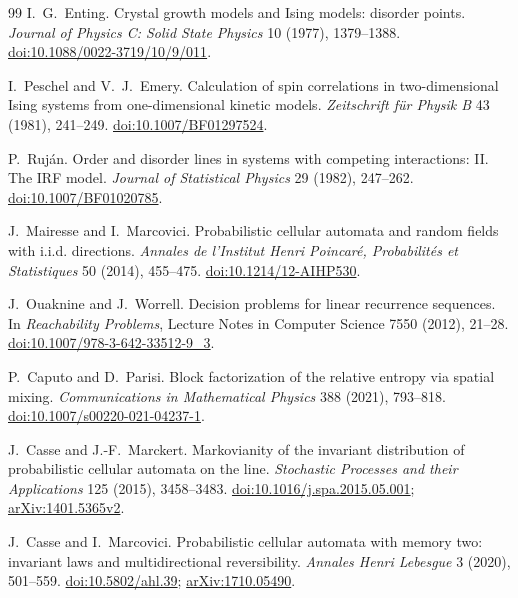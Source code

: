 \begin{thebibliography}{99}
 I.~G.~Enting.
Crystal growth models and Ising models: disorder points.
\emph{Journal of Physics C: Solid State Physics} 10 (1977), 1379--1388.
\href{https://doi.org/10.1088/0022-3719/10/9/011}{doi:10.1088/0022-3719/10/9/011}.

 I.~Peschel and V.~J.~Emery.
Calculation of spin correlations in two-dimensional Ising systems from one-dimensional kinetic models.
\emph{Zeitschrift f\"ur Physik B} 43 (1981), 241--249.
\href{https://doi.org/10.1007/BF01297524}{doi:10.1007/BF01297524}.

 P.~Ruj\'an.
Order and disorder lines in systems with competing interactions: II. The IRF model.
\emph{Journal of Statistical Physics} 29 (1982), 247--262.
\href{https://doi.org/10.1007/BF01020785}{doi:10.1007/BF01020785}.

 J.~Mairesse and I.~Marcovici.
Probabilistic cellular automata and random fields with i.i.d. directions.
\emph{Annales de l'Institut Henri Poincar\'e, Probabilit\'es et Statistiques} 50 (2014), 455--475.
\href{https://doi.org/10.1214/12-AIHP530}{doi:10.1214/12-AIHP530}.

 J.~Ouaknine and J.~Worrell.
Decision problems for linear recurrence sequences.
In \emph{Reachability Problems}, Lecture Notes in Computer Science 7550 (2012), 21--28.
\href{https://doi.org/10.1007/978-3-642-33512-9_3}{doi:10.1007/978-3-642-33512-9\_3}.

 P.~Caputo and D.~Parisi.
Block factorization of the relative entropy via spatial mixing.
\emph{Communications in Mathematical Physics} 388 (2021), 793--818.
\href{https://doi.org/10.1007/s00220-021-04237-1}{doi:10.1007/s00220-021-04237-1}.

 J.~Casse and J.-F.~Marckert.
Markovianity of the invariant distribution of probabilistic cellular automata on the line.
\emph{Stochastic Processes and their Applications} 125 (2015), 3458--3483.
\href{https://doi.org/10.1016/j.spa.2015.05.001}{doi:10.1016/j.spa.2015.05.001};
\href{https://arxiv.org/abs/1401.5365v2}{arXiv:1401.5365v2}.

 J.~Casse and I.~Marcovici.
Probabilistic cellular automata with memory two: invariant laws and multidirectional reversibility.
\emph{Annales Henri Lebesgue} 3 (2020), 501--559.
\href{https://doi.org/10.5802/ahl.39}{doi:10.5802/ahl.39};
\href{https://arxiv.org/abs/1710.05490}{arXiv:1710.05490}.


\end{thebibliography}
